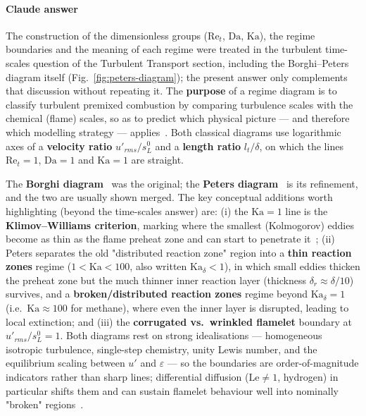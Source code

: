 {\color{istblue}
\paragraph{Claude answer}
The construction of the dimensionless groups ($\mathrm{Re}_t$, $\mathrm{Da}$, $\mathrm{Ka}$), the regime boundaries and the meaning of each regime were treated in the turbulent time-scales question of the Turbulent Transport section, including the Borghi--Peters diagram itself (Fig.~\ref{fig:peters-diagram}); the present answer only complements that discussion without repeating it. The \textbf{purpose} of a regime diagram is to classify turbulent premixed combustion by comparing turbulence scales with the chemical (flame) scales, so as to predict which physical picture --- and therefore which modelling strategy --- applies~\cite{peters2000turbulent,warnatz2006combustion,veynante2002turbulent}. Both classical diagrams use logarithmic axes of a \textbf{velocity ratio} $u'_{rms}/s_L^0$ and a \textbf{length ratio} $l_t/\delta$, on which the lines $\mathrm{Re}_t=1$, $\mathrm{Da}=1$ and $\mathrm{Ka}=1$ are straight.

The \textbf{Borghi diagram}~\cite{borghi1985structure} was the original; the \textbf{Peters diagram}~\cite{peters2000turbulent} is its refinement, and the two are usually shown merged. The key conceptual additions worth highlighting (beyond the time-scales answer) are: (i) the $\mathrm{Ka}=1$ line is the \textbf{Klimov--Williams criterion}, marking where the smallest (Kolmogorov) eddies become as thin as the flame preheat zone and can start to penetrate it~\cite{peters2000turbulent,roekaerts2010jmbc}; (ii) Peters separates the old "distributed reaction zone" region into a \textbf{thin reaction zones} regime ($1<\mathrm{Ka}<100$, also written $\mathrm{Ka}_\delta<1$), in which small eddies thicken the preheat zone but the much thinner inner reaction layer (thickness $\delta_r\approx\delta/10$) survives, and a \textbf{broken/distributed reaction zones} regime beyond $\mathrm{Ka}_\delta=1$ (i.e.\ $\mathrm{Ka}\approx100$ for methane), where even the inner layer is disrupted, leading to local extinction; and (iii) the \textbf{corrugated vs.\ wrinkled flamelet} boundary at $u'_{rms}/s_L^0=1$. Both diagrams rest on strong idealisations --- homogeneous isotropic turbulence, single-step chemistry, unity Lewis number, and the equilibrium scaling between $u'$ and $\varepsilon$ --- so the boundaries are order-of-magnitude indicators rather than sharp lines; differential diffusion ($\mathrm{Le}\neq1$, hydrogen) in particular shifts them and can sustain flamelet behaviour well into nominally "broken" regions~\cite{veynante2002turbulent,warnatz2006combustion}.

}
